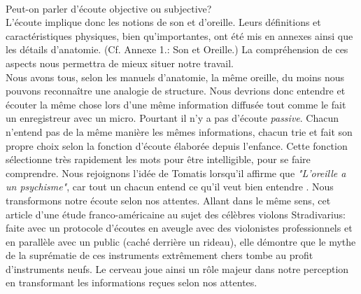 \\
Peut-on parler d'écoute objective ou subjective?
\\
L'écoute implique donc les notions de son et
d'oreille. Leurs définitions et caractéristiques physiques, bien qu'importantes, ont été mis en
annexes ainsi que les détails
d'anatomie. (Cf. Annexe 1.: Son et Oreille.)
La compréhension de ces aspects nous
permettra de mieux situer notre travail.
\\
Nous avons tous,
selon les manuels d'anatomie, la même
oreille, du moins nous pouvons reconnaître une analogie de structure. Nous devrions donc entendre et écouter la même chose
lors d'une même information diffusée tout comme le fait un enregistreur avec un micro. Pourtant il n'y a pas d'écoute \emph{passive}. Chacun n'entend pas de la même manière les mêmes
informations, chacun trie et fait son propre choix selon la fonction
d'écoute élaborée depuis l'enfance. Cette fonction sélectionne très
rapidement les mots pour être intelligible, pour se faire
comprendre. Nous rejoignons l'idée de Tomatis lorsqu'il affirme que
\textit{"L'oreille a un psychisme"}, car tout un chacun entend ce qu'il veut bien
entendre \autocite [167]{tomatis_oreille_1987}.
Nous transformons notre écoute selon nos attentes.
Allant dans le même sens, cet
article d'une
étude franco-américaine \autocite{lemonde.fr:stradivarius} au sujet des célèbres violons
Stradivarius: faite avec un protocole
d'écoutes en aveugle avec
des violonistes professionnels et en parallèle avec un public (caché
derrière un rideau), elle démontre que le mythe de la suprématie
de ces instruments extrêmement chers tombe au profit d'instruments
neufs. Le cerveau  joue ainsi un
rôle majeur dans notre perception en 
transformant les informations reçues selon nos attentes.
%

